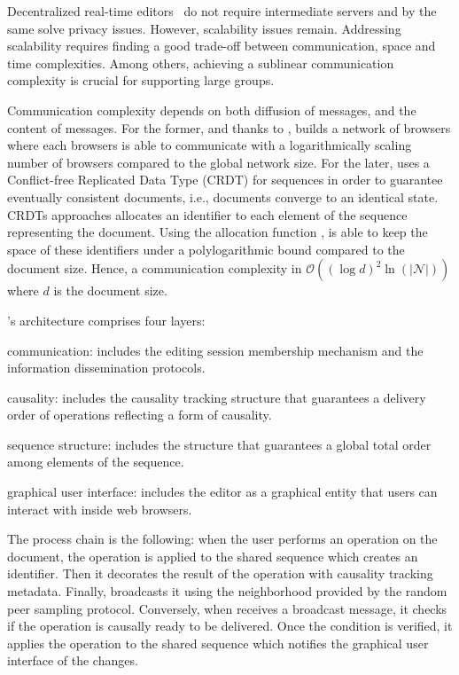 Decentralized real-time editors~\cite{oster2006data, sun1998operational,
  sun2009contextbased} do not require intermediate servers and by the same solve
privacy issues. However, scalability issues remain.  Addressing scalability
requires finding a good trade-off between communication, space and time
complexities. Among others, achieving a sublinear communication complexity is
crucial for supporting large groups.

Communication complexity depends on both diffusion of messages, and the content
of messages. For the former, and thanks to \SPRAY, \CRATE builds a network of
browsers where each browsers is able to communicate with a logarithmically
scaling number of browsers compared to the global network size. For the later,
\CRATE uses a Conflict-free Replicated Data Type (CRDT) for sequences in order
to guarantee eventually consistent documents, i.e., documents converge to an
identical state. CRDTs approaches allocates an identifier to each element of the
sequence representing the document. Using the allocation function \LSEQ, \CRATE
is able to keep the space of these identifiers under a polylogarithmic bound
compared to the document size. Hence, a communication complexity in
$\mathcal{O}((\log d)^2\ln(|\mathcal{N}|))$ where $d$ is the document size.

%   

\CRATE's architecture comprises four layers:
\begin{inparaenum}[(i)]
\item communication: includes the editing session membership mechanism and the
  information dissemination protocols.
\item causality: includes the causality tracking structure that guarantees a
  delivery order of operations reflecting a form of causality.
\item sequence structure: includes the structure that guarantees a global
  total order among elements of the sequence.
\item graphical user interface: includes the editor as a graphical entity that
  users can interact with inside web browsers.
\end{inparaenum}
The process chain is the following: when the user performs an operation on the
document, the operation is applied to the shared sequence which creates an \LSEQ
identifier. Then it decorates the result of the operation with causality
tracking metadata. Finally, \CRATE broadcasts it using the neighborhood provided
by the \SPRAY random peer sampling protocol.  Conversely, when \CRATE receives a
broadcast message, it checks if the operation is causally ready to be
delivered. Once the condition is verified, it applies the operation to the
shared sequence which notifies the graphical user interface of the changes. 

